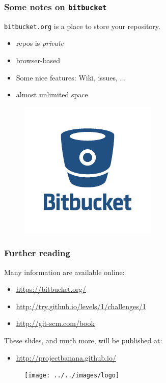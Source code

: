 \documentclass{beamer}
\begin{document}
\begin{frame}
 \frametitle{Some notes on \texttt{bitbucket}}
 \vspace{1.5cm}
 \texttt{bitbucket.org} is a place to store your repository.
 \begin{itemize}
  \item repos is \textit{private}
  \item browser-based
  \item Some nice features: Wiki, issues, ...
  \item almost unlimited space
 \end{itemize}
\begin{figure}
\hfill \includegraphics[scale=0.35]{images/bitbucket-logo}
\end{figure}
\end{frame}


% 
\begin{frame}
\frametitle{Further reading}
Many information are available online:
\begin{itemize}
 \item \url{https://bitbucket.org/}
 \item \url{http://try.github.io/levels/1/challenges/1}
 \item \url{http://git-scm.com/book}
\end{itemize}
These slides, and much more, will be published at:
\begin{itemize}
 \item \url{http://projectbanana.github.io/}
\end{itemize}
 \begin{figure}
\centering
 \texttt{[image: ../../images/logo]}
\end{figure}
\end{frame}
\end{document}
